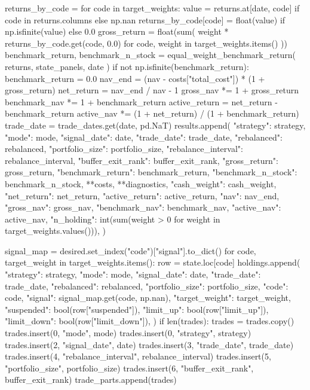 \documentclass[UTF8,a4paper,fontset=fandol]{ctexart}
\begin{document}
\begin{ProjectCode}
        returns_by_code = {}
        for code in target_weights:
            value = returns.at[date, code] if code in returns.columns else np.nan
            returns_by_code[code] = float(value) if np.isfinite(value) else 0.0
        gross_return = float(sum(
            weight * returns_by_code.get(code, 0.0)
            for code, weight in target_weights.items()
        ))
        benchmark_return, benchmark_n_stock = equal_weight_benchmark_return(
            returns, state_panels, date
        )
        if not np.isfinite(benchmark_return):
            benchmark_return = 0.0
        nav_end = (nav - costs["total_cost"]) * (1 + gross_return)
        net_return = nav_end / nav - 1
        gross_nav *= 1 + gross_return
        benchmark_nav *= 1 + benchmark_return
        active_return = net_return - benchmark_return
        active_nav *= (1 + net_return) / (1 + benchmark_return)
        trade_date = trade_dates.get(date, pd.NaT)
        results.append({
            "strategy": strategy,
            "mode": mode,
            "signal_date": date,
            "trade_date": trade_date,
            "rebalanced": rebalanced,
            "portfolio_size": portfolio_size,
            "rebalance_interval": rebalance_interval,
            "buffer_exit_rank": buffer_exit_rank,
            "gross_return": gross_return,
            "benchmark_return": benchmark_return,
            "benchmark_n_stock": benchmark_n_stock,
            **costs,
            **diagnostics,
            "cash_weight": cash_weight,
            "net_return": net_return,
            "active_return": active_return,
            "nav": nav_end,
            "gross_nav": gross_nav,
            "benchmark_nav": benchmark_nav,
            "active_nav": active_nav,
            "n_holding": int(sum(weight > 0 for weight in target_weights.values())),
        })

        signal_map = desired.set_index("code")["signal"].to_dict()
        for code, target_weight in target_weights.items():
            row = state.loc[code]
            holdings.append({
                "strategy": strategy,
                "mode": mode,
                "signal_date": date,
                "trade_date": trade_date,
                "rebalanced": rebalanced,
                "portfolio_size": portfolio_size,
                "code": code,
                "signal": signal_map.get(code, np.nan),
                "target_weight": target_weight,
                "suspended": bool(row["suspended"]),
                "limit_up": bool(row["limit_up"]),
                "limit_down": bool(row["limit_down"]),
            })
        if len(trades):
            trades = trades.copy()
            trades.insert(0, "mode", mode)
            trades.insert(0, "strategy", strategy)
            trades.insert(2, "signal_date", date)
            trades.insert(3, "trade_date", trade_date)
            trades.insert(4, "rebalance_interval", rebalance_interval)
            trades.insert(5, "portfolio_size", portfolio_size)
            trades.insert(6, "buffer_exit_rank", buffer_exit_rank)
            trade_parts.append(trades)


\end{ProjectCode}
\end{document}
